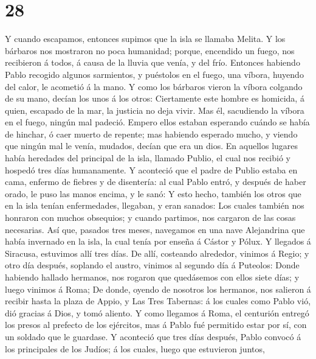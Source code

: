 \hypertarget{section-27}{%
\section{28}\label{section-27}}

 Y cuando escapamos, entonces supimos que la isla se llamaba
Melita.  Y los bárbaros nos mostraron no poca humanidad;
porque, encendido un fuego, nos recibieron á todos, á causa de la lluvia
que venía, y del frío.  Entonces habiendo Pablo recogido
algunos sarmientos, y puéstolos en el fuego, una víbora, huyendo del
calor, le acometió á la mano.  Y como los bárbaros vieron la
víbora colgando de su mano, decían los unos á los otros: Ciertamente
este hombre es homicida, á quien, escapado de la mar, la justicia no
deja vivir.  Mas él, sacudiendo la víbora en el fuego,
ningún mal padeció.  Empero ellos estaban esperando cuándo
se había de hinchar, ó caer muerto de repente; mas habiendo esperado
mucho, y viendo que ningún mal le venía, mudados, decían que era un
dios.  En aquellos lugares había heredades del principal de
la isla, llamado Publio, el cual nos recibió y hospedó tres días
humanamente.  Y aconteció que el padre de Publio estaba en
cama, enfermo de fiebres y de disentería: al cual Pablo entró, y después
de haber orado, le puso las manos encima, y le sanó:  Y esto
hecho, también los otros que en la isla tenían enfermedades, llegaban, y
eran sanados:  Los cuales también nos honraron con muchos
obsequios; y cuando partimos, nos cargaron de las cosas necesarias.
 Así que, pasados tres meses, navegamos en una nave
Alejandrina que había invernado en la isla, la cual tenía por enseña á
Cástor y Pólux.  Y llegados á Siracusa, estuvimos allí tres
días.  De allí, costeando alrededor, vinimos á Regio; y
otro día después, soplando el austro, vinimos al segundo día á Puteolos:
 Donde habiendo hallado hermanos, nos rogaron que
quedásemos con ellos siete días; y luego vinimos á Roma; 
De donde, oyendo de nosotros los hermanos, nos salieron á recibir hasta
la plaza de Appio, y Las Tres Tabernas: á los cuales como Pablo vió, dió
gracias á Dios, y tomó aliento.  Y como llegamos á Roma, el
centurión entregó los presos al prefecto de los ejércitos, mas á Pablo
fué permitido estar por sí, con un soldado que le guardase.
 Y aconteció que tres días después, Pablo convocó á los
principales de los Judíos; á los cuales, luego que estuvieron juntos,
